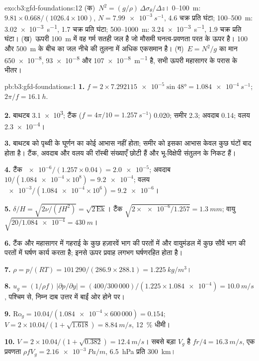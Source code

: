 \begin{solution}{exo:b3:gfd-foundations:12}
(क)~$N^2 = (g/\rho)\,\Delta\sigma_\theta/\Delta z$। 0--\qty{100}{m}:
$9.81\times0.668/(1026.4\times100)$, $N = \qty{7.99e-3}{s^{-1}}$, 4.6
चक्र प्रति घंटा; 100--\qty{500}{m}: \qty{3.02e-3}{s^{-1}}, 1.7 चक्र
प्रति घंटा; 500--\qty{1000}{m}: \qty{3.24e-3}{s^{-1}}, 1.9 चक्र प्रति घंटा।
(ख)~ऊपरी \qty{100}{m} में वह गर्म सतही जल है जो मौसमी
घनत्व-प्रवणता परत के ऊपर है। 100 और \qty{500}{m} के बीच का जल
नीचे की तुलना में अधिक एकसमान है। (ग)~$E = N^2/g$ का मान \num{650e-8}, \num{93e-8} और
\qty{107e-8}{m^{-1}} है, सभी ऊपरी महासागर के परास के भीतर।
\end{solution}

\begin{solution}{pb:b3:gfd-foundations:1}
\textbf{1.} $f = 2\times\num{7.292115e-5}\sin\ang{48} =
\qty{1.084e-4}{s^{-1}}$; $2\pi/f = \qty{16.1}{h}$.

\textbf{2.} बाथटब \num{3.1e3}; टैंक ($f = 4\pi/10 = \qty{1.257}{s^{-1}}$)
0.020; समीर 2.3; अवदाब 0.14; वलय \num{2.3e-4}।

\textbf{3.} बाथटब को पृथ्वी के घूर्णन का कोई आभास नहीं होता; समीर
को इसका आभास केवल कुछ घंटों बाद होता है। टैंक, अवदाब और वलय की
रॉस्बी संख्याएँ छोटी हैं और भू-विक्षेपी संतुलन के निकट हैं।

\textbf{4.} टैंक $\num{e-6}/(1.257\times0.04) = \num{2.0e-5}$; अवदाब
$10/(\num{1.084e-4}\times10^8) = \num{9.2e-4}$; वलय
$\num{e-3}/(\num{1.084e-4}\times10^6) = \num{9.2e-6}$।

\textbf{5.} $\delta/H = \sqrt{2\nu/(fH^2)} = \sqrt{2\,\mathrm{Ek}}$। टैंक
$\sqrt{2\times\num{e-6}/1.257} = \qty{1.3}{mm}$; वायु $\sqrt{20/\num{1.084e-4}}
= \qty{430}{m}$।

\textbf{6.} टैंक और महासागर में गहराई के कुछ हज़ारवें भाग की परतों में
और वायुमंडल में कुछ सौवें भाग की परतों में घर्षण कार्य करता है; इनसे ऊपर
प्रवाह लगभग घर्षणरहित होता है।

\textbf{7.} $\rho = p/(RT) = 101\,290/(286.9\times288.1) =
\qty{1.225}{kg/m^3}$।

\textbf{8.} $u_g = (1/\rho f)\,|\partial p/\partial y| = (400/300\,000)/(1.225
\times\num{1.084e-4}) = \qty{10.0}{m/s}$, पश्चिम से, निम्न दाब
उत्तर में बाईं ओर होने पर।

\textbf{9.} $\mathrm{Ro}_g = 10.04/(\num{1.084e-4}\times600\,000) = 0.154$;
$V = 2\times10.04/(1 + \sqrt{1.618}) = \qty{8.84}{m/s}$, \qty{12}{\percent}
धीमी।

\textbf{10.} $V = 2\times10.04/(1 + \sqrt{0.382}) = \qty{12.4}{m/s}$।
सबसे बड़ा $V_g$ है $fr/4 = \qty{16.3}{m/s}$, एक प्रवणता $\rho fV_g =
\qty{2.16e-3}{Pa/m}$, \qty{6.5}{hPa} प्रति \qty{300}{km}।


\end{solution}
